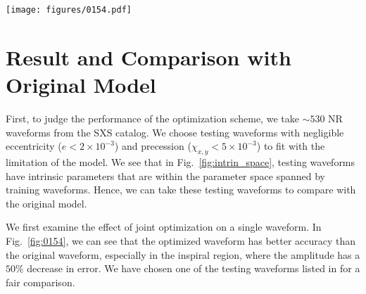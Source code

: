 \documentclass[twocolumn]{aastex631}
\newcommand{\te}[1]{{\color{rr}[TE: #1 ]}}
\begin{document}
\begin{figure*}[t]
	\centering
	\texttt{[image: figures/0154.pdf]}
	\caption{Comparison between original and optimized IMRPhenomD waveforms. Here shows the SXS:BBH:0154 NR waveform, which has mass ratio $q=1$ and $\chi_1=\chi_2=-0.8$. The original mismatch is around $2.8\times10^{-4}$ and the optimized mismatch is around $5.3\times10^{-5}$. Top: It shows the amplitude and phase of NR, original IMRPhenomD and optimized IMRPhenomD waveform. Bottom: It shows the relative error of amplitudes between NR and IMRPhenomD waveforms, and the absolute error of phases between NR and IMRPhenomD waveforms \te{I realize that this is also an error in the ripple paper, but the bottom panels should have abs round the whole y axis, otherwise why are they strictly positive? I actually think just plotting the error itself i.e. allowing for positive and negative values would potentially look better. Its also useful to add the vertical lines corresponding the different waveform regions. Otherwise one might think that the oscillations will line up with this and its some weird artifact of the splitting. The top and bottom panels should probably share x axes, or at least have the same scales so that they can be compared easily. }}
	\label{fig:0154}
\end{figure*}

\section{Result and Comparison with Original Model} \label{sec:result}

First, to judge the performance of the optimization scheme, we take $\sim530$ NR waveforms from the SXS catalog. We choose testing waveforms with negligible eccentricity (${e<2\times10^{-3}}$) and precession (${\chi_{x,y}<5\times10^{-3}}$) to fit with the limitation of the model. We see that in Fig.~\ref{fig:intrin_space}, testing waveforms have intrinsic parameters that are within the parameter space spanned by training waveforms. Hence, we can take these testing waveforms to compare with the original model. 

We first examine the effect of joint optimization on a single waveform. In Fig.~\ref{fig:0154}, we can see that the optimized waveform has better accuracy than the original waveform, especially in the inspiral region, where the amplitude has a $50\%$ decrease in error. We have chosen one of the testing waveforms listed in \citep{khan2016frequency} for a fair comparison. 
\end{document}

